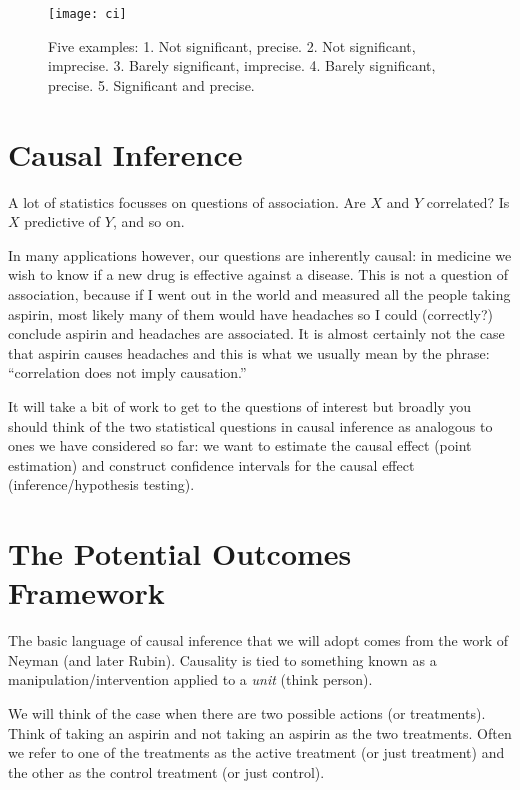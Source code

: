 \documentclass[twoside,12pt]{article}
\begin{document}
\begin{figure}
\vspace{-1in}
\begin{center}
\texttt{[image: ci]}
\end{center}
\caption{Five examples:
1. Not significant, precise.
2. Not significant, imprecise.
3. Barely significant, imprecise.
4. Barely significant, precise.
5. Significant and precise.}
\label{fig::testversusci}
\end{figure}



\section{Causal Inference}
A lot of statistics focusses on questions of association. Are $X$ and $Y$ correlated? Is $X$ predictive of $Y$, and so on. 

In many applications however, our questions are inherently causal: in medicine we wish to know if a new drug is effective against a disease. This is not a question of association, because if I went out in the world and measured all the people taking aspirin, most likely many of them would have headaches so I could (correctly?) conclude aspirin and headaches are associated.  
It is almost certainly not the case that aspirin causes headaches and this is what we usually mean by the phrase: ``correlation does not imply causation.''

It will take a bit of work to get to the questions of interest but broadly you should think of the two statistical questions in causal inference as analogous to ones we have considered so far: we want to estimate the causal effect (point estimation) and construct confidence intervals for the causal effect (inference/hypothesis testing).

\section{The Potential Outcomes Framework}
The basic language of causal inference that we will adopt comes from the work of Neyman (and later Rubin). Causality is tied to something known as a manipulation/intervention applied to a \emph{unit} (think person). 

We will think of the case when there are two possible actions (or treatments). Think of taking an aspirin and not taking an aspirin as the two treatments. Often we refer to one of the treatments as the active treatment (or just treatment) and the other as the control treatment (or just control).
\end{document}
